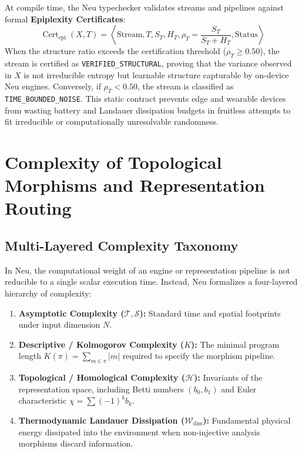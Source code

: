 \documentclass[11pt]{article}
\begin{document}
At compile time, the Neu typechecker validates streams and pipelines against formal \textbf{Epiplexity Certificates}:
\begin{equation}
\operatorname{Cert}_{\text{epi}}(X, T) = \left\langle \text{Stream}, T, S_T, H_T, \rho_T = \frac{S_T}{S_T + H_T}, \text{Status} \right\rangle
\end{equation}
When the structure ratio exceeds the certification threshold ($\rho_T \ge 0.50$), the stream is certified as \texttt{VERIFIED\_STRUCTURAL}, proving that the variance observed in $X$ is not irreducible entropy but learnable structure capturable by on-device Neu engines. Conversely, if $\rho_T < 0.50$, the stream is classified as \texttt{TIME\_BOUNDED\_NOISE}. This static contract prevents edge and wearable devices from wasting battery and Landauer dissipation budgets in fruitless attempts to fit irreducible or computationally unresolvable randomness.

\section{Complexity of Topological Morphisms and Representation Routing}

\subsection{Multi-Layered Complexity Taxonomy}
In Neu, the computational weight of an engine or representation pipeline is not reducible to a single scalar execution time. Instead, Neu formalizes a four-layered hierarchy of complexity:
\begin{enumerate}
    \item \textbf{Asymptotic Complexity ($\mathcal{T}, \mathcal{S}$):} Standard time and spatial footprints under input dimension $N$.
    \item \textbf{Descriptive / Kolmogorov Complexity ($K$):} The minimal program length $K(\pi) = \sum_{m \in \pi} |m|$ required to specify the morphism pipeline.
    \item \textbf{Topological / Homological Complexity ($\mathcal{H}$):} Invariants of the representation space, including Betti numbers $(b_0, b_1)$ and Euler characteristic $\chi = \sum (-1)^k b_k$.
    \item \textbf{Thermodynamic Landauer Dissipation ($\mathcal{W}_{\text{diss}}$):} Fundamental physical energy dissipated into the environment when non-injective analysis morphisms discard information.
\end{enumerate}
\end{document}
